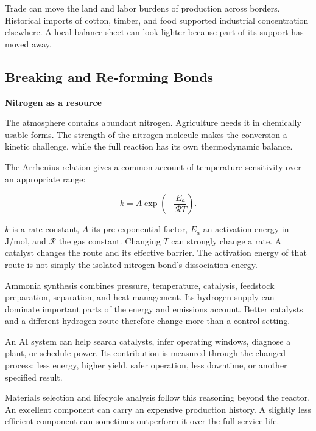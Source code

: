 \documentclass[11pt,openany]{book}
\newcommand{\subhead}[1]{\par\medskip\noindent\textbf{#1}\par\nobreak\smallskip}
\begin{document}
Trade can move the land and labor burdens of production across borders. Historical imports of cotton, timber, and food supported industrial concentration elsewhere. A local balance sheet can look lighter because part of its support has moved away.

\subsection{Breaking and Re-forming Bonds}

\subhead{Nitrogen as a resource}

The atmosphere contains abundant nitrogen. Agriculture needs it in chemically usable forms. The strength of the nitrogen molecule makes the conversion a kinetic challenge, while the full reaction has its own thermodynamic balance.\cite{erisman2008how,jia2014mechanistic}

The Arrhenius relation gives a common account of temperature sensitivity over an appropriate range:

\begin{equation}
k=A\exp\left(-\frac{E_a}{\mathcal RT}\right).
\label{eq:arrhenius}
\end{equation}

$k$ is a rate constant, $A$ its pre-exponential factor, $E_a$ an activation energy in J/mol, and $\mathcal R$ the gas constant. Changing $T$ can strongly change a rate. A catalyst changes the route and its effective barrier. The activation energy of that route is not simply the isolated nitrogen bond's dissociation energy.

Ammonia synthesis combines pressure, temperature, catalysis, feedstock preparation, separation, and heat management. Its hydrogen supply can dominate important parts of the energy and emissions account. Better catalysts and a different hydrogen route therefore change more than a control setting.

An AI system can help search catalysts, infer operating windows, diagnose a plant, or schedule power. Its contribution is measured through the changed process: less energy, higher yield, safer operation, less downtime, or another specified result.

Materials selection and lifecycle analysis follow this reasoning beyond the reactor.\cite{ashby2012materials,allwood2012sustainable} An excellent component can carry an expensive production history. A slightly less efficient component can sometimes outperform it over the full service life.
\end{document}
